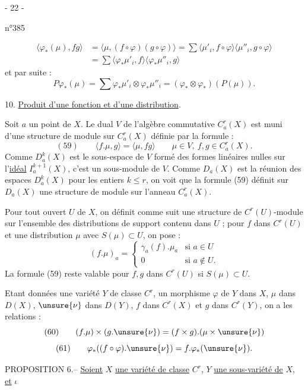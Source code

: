\begin{center}- 22 -\end{center}
\begin{flushright}n°385\end{flushright}
\[
\begin{aligned}
\langle\varphi_*(\mu),fg\rangle
&=\langle\mu,(f\circ\varphi)(g\circ\varphi)\rangle
=\sum\langle\mu'_i,f\circ\varphi\rangle\langle\mu''_i,g\circ\varphi\rangle\\
&=\sum\langle\varphi_*\mu'_i,f\rangle\langle\varphi_*\mu''_i,g\rangle
\end{aligned}
\]
et par suite :
\[
P\varphi_*(\mu)=\sum\varphi_*\mu'_i\otimes\varphi_*\mu''_i
=(\varphi_*\otimes\varphi_*)(P(\mu)).
\]

10. \uline{Produit d'une fonction et d'une distribution}.

Soit $a$ un point de $X$. Le dual $V$ de l'algèbre commutative $C_a^r(X)$ est muni d'une structure de module sur $C_a^r(X)$ définie par la formule :
\[
(59)\qquad \langle f.\mu,g\rangle=\langle\mu,fg\rangle
\qquad \mu\in V,\ f,g\in C_a^r(X).
\]
Comme $D_a^k(X)$ est le sous-espace de $V$ formé des formes linéaires nulles sur l'\uline{idéal} $I_a^{k+1}(X)$, c'est un sous-module de $V$. Comme $D_a(X)$ est la réunion des espaces $D_a^k(X)$ pour les entiers $k\leq r$, on voit que la formule (59) définit sur $D_a(X)$ une structure de module sur l'anneau $C_a^r(X)$.

Pour tout ouvert $U$ de $X$, on définit comme suit une structure de $C^r(U)$-module sur l'ensemble des distributions de support contenu dans $U$ ; pour $f$ dans $C^r(U)$ et une distribution $\mu$ avec $S(\mu)\subset U$, on pose :
\[
(f.\mu)_a=
\begin{cases}
\gamma_a(f).\mu_a&\text{si }a\in U\\[1ex]
0&\text{si }a\notin U.
\end{cases}
\]
La formule (59) reste valable pour $f,g$ dans $C^r(U)$ si $S(\mu)\subset U$.

Etant données une variété $Y$ de classe $C^r$, un morphisme $\varphi$ de $Y$ dans $X$, $\mu$ dans $D(X)$, $\unsure{\nu}$ dans $D(Y)$, $f$ dans $C^r(X)$ et $g$ dans $C^r(Y)$, on a les relations :
\[
(60)\qquad (f.\mu)\times(g.\unsure{\nu})=(f\times g).(\mu\times\unsure{\nu})
\]
\[
(61)\qquad \varphi_*((f\circ\varphi).\unsure{\nu})=f.\varphi_*(\unsure{\nu}).
\]

PROPOSITION 6.-- \uline{Soient} $X$ \uline{une variété de classe} $C^r$, $Y$ \uline{une sous-variété de} $X$, \uline{et} $\iota$
